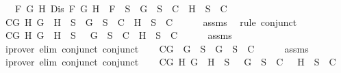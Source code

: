\begin{isabellebody}
\ \ \ {\isachardoublequoteopen}{\isasymforall}F\ G\ H{\isachardot}\ Dis\ F\ G\ H\ {\isasymlongrightarrow}\ F\ {\isasymin}\ S\ {\isasymlongrightarrow}\ {\isacharbraceleft}G{\isacharbraceright}\ {\isasymunion}\ S\ {\isasymin}\ C\ {\isasymor}\ {\isacharbraceleft}H{\isacharbraceright}\ {\isasymunion}\ S\ {\isasymin}\ C{\isachardoublequoteclose}\isanewline
%
\isadelimproof
%
\endisadelimproof
%
\isatagproof
{}\isamarkupfalse%
\ {\isacharminus}\isanewline
\ \ \isamarkupfalse%
\ C{}{\isacharcolon}{\isachardoublequoteopen}{\isasymforall}G\ H{\isachardot}\ G\ \isactrlbold {\isasymor}\ H\ {\isasymin}\ S\ {\isasymlongrightarrow}\ {\isacharbraceleft}G{\isacharbraceright}\ {\isasymunion}\ S\ {\isasymin}\ C\ {\isasymor}\ {\isacharbraceleft}H{\isacharbraceright}\ {\isasymunion}\ S\ {\isasymin}\ C{\isachardoublequoteclose}\isanewline
\ \ \ \ \isamarkupfalse%
\ assms\ \isamarkupfalse%
\ {\isacharparenleft}rule\ conjunct{}{\isacharparenright}\isanewline
\ \ \isamarkupfalse%
\ C{}{\isacharcolon}{\isachardoublequoteopen}{\isasymforall}G\ H{\isachardot}\ G\ \isactrlbold {\isasymrightarrow}\ H\ {\isasymin}\ S\ {\isasymlongrightarrow}\ {\isacharbraceleft}\isactrlbold {\isasymnot}\ G{\isacharbraceright}\ {\isasymunion}\ S\ {\isasymin}\ C\ {\isasymor}\ {\isacharbraceleft}H{\isacharbraceright}\ {\isasymunion}\ S\ {\isasymin}\ C{\isachardoublequoteclose}\isanewline
\ \ \ \ \isamarkupfalse%
\ assms\ \isamarkupfalse%
\ {\isacharparenleft}iprover\ elim{\isacharcolon}\ conjunct{}\ conjunct{}{\isacharparenright}\isanewline
\ \ \isamarkupfalse%
\ C{}{\isacharcolon}{\isachardoublequoteopen}{\isasymforall}G{\isachardot}\ \isactrlbold {\isasymnot}\ {\isacharparenleft}\isactrlbold {\isasymnot}G{\isacharparenright}\ {\isasymin}\ S\ {\isasymlongrightarrow}\ {\isacharbraceleft}G{\isacharbraceright}\ {\isasymunion}\ S\ {\isasymin}\ C{\isachardoublequoteclose}\isanewline
\ \ \ \ \isamarkupfalse%
\ assms\ \isamarkupfalse%
\ {\isacharparenleft}iprover\ elim{\isacharcolon}\ conjunct{}\ conjunct{}{\isacharparenright}\isanewline
\ \ \isamarkupfalse%
\ C{}{\isacharcolon}{\isachardoublequoteopen}{\isasymforall}G\ H{\isachardot}\ \isactrlbold {\isasymnot}{\isacharparenleft}G\ \isactrlbold {\isasymand}\ H{\isacharparenright}\ {\isasymin}\ S\ {\isasymlongrightarrow}\ {\isacharbraceleft}\isactrlbold {\isasymnot}\ G{\isacharbraceright}\ {\isasymunion}\ S\ {\isasymin}\ C\ {\isasymor}\ {\isacharbraceleft}\isactrlbold {\isasymnot}\ H{\isacharbraceright}\ {\isasymunion}\ S\ {\isasymin}\ C{\isachardoublequoteclose}\isanewline

\end{isabellebody}
